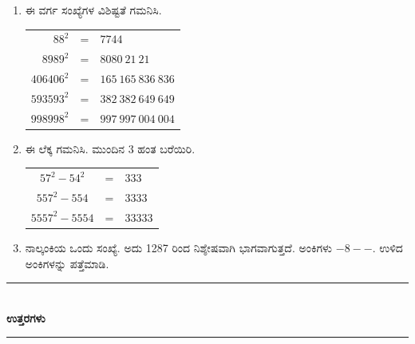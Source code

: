 \begin{enumerate}
\item ಈ ವರ್ಗ ಸಂಖ್ಯೆಗಳ ವಿಶಿಷ್ಟತೆ ಗಮನಿಸಿ. 

\begin{tabular}[t]{r@{\;}c@{\;}l}
$88^{2}$ & = & $7744$\\
$8989^{2}$ & = & $8080~21~21$\\
$406406^{2}$ & = & $165~165~836~836$\\
$593593^{2}$ & = & $382~382~649~649$\\
$998998^{2}$ & = & $997~997~004~004$
\end{tabular}

\item ಈ ಲೆಕ್ಕ ಗಮನಿಸಿ. ಮುಂದಿನ 3 ಹಂತ ಬರೆಯಿರಿ. 

\begin{tabular}[t]{c@{\;}c@{\;}l}
$57^{2} - 54^{2}$ & = & $333$\\
$557^{2} - 554$ & = & $3333$\\
$5557^{2} - 5554$ & = & $33333$
\end{tabular}

\item ನಾಲ್ಕಂಕಿಯ ಒಂದು ಸಂಖ್ಯೆ. ಅದು 1287 ರಿಂದ ನಿಶ್ಶೇಷವಾಗಿ ಭಾಗವಾಗುತ್ತದೆ. ಅಂಕಿಗಳು $- 8 - -$. ಉಳಿದ ಅಂಕಿಗಳನ್ನು ಪತ್ತೆಮಾಡಿ.  
\end{enumerate}


\begin{center}
\rule{5cm}{1pt}\\[3pt]
{\Large\bfseries ಉತ್ತರಗಳು}\\[-0.1cm]
\rule{5cm}{1pt}
\end{center}

